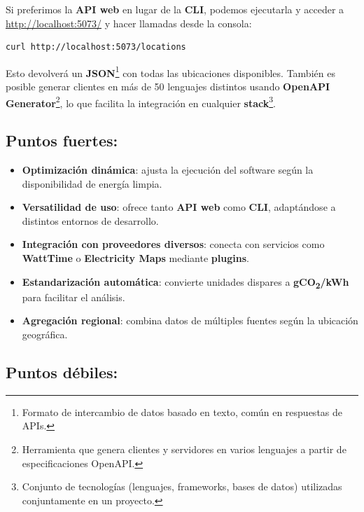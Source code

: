 \documentclass[12pt,a4paper]{report}
\begin{document}
Si preferimos la \textbf{API web} en
lugar de la \textbf{CLI}, podemos ejecutarla y
acceder a \href{http://localhost:5073}{http://localhost:5073/} y hacer llamadas
desde la consola:

\begin{tcolorbox}[colback=codebackground, colframe=codeborder, boxrule=0.8pt, arc=0mm, boxsep=5pt, left=5pt, right=5pt, top=5pt, bottom=5pt]
  \begin{lstlisting}[language=bash]
curl http://localhost:5073/locations
\end{lstlisting}
\end{tcolorbox}

Esto devolverá un \textbf{JSON}\footnote{Formato de intercambio de datos basado
  en texto, común en respuestas de APIs.} con todas las ubicaciones disponibles.
También es posible generar clientes en más de 50 lenguajes distintos usando
\textbf{OpenAPI Generator}\footnote{Herramienta que genera clientes y
  servidores en varios lenguajes a partir de especificaciones OpenAPI.}, lo que
facilita la integración en cualquier \textbf{stack}\footnote{Conjunto de
  tecnologías (lenguajes, frameworks, bases de datos) utilizadas conjuntamente en
  un proyecto.}.

\subsection*{Puntos fuertes:}

\begin{itemize}
  \item \textbf{Optimización dinámica}: ajusta la ejecución del software según la disponibilidad de energía limpia.
  \item \textbf{Versatilidad de uso}: ofrece tanto \textbf{API web} como \textbf{CLI}, adaptándose a distintos entornos de desarrollo.
  \item \textbf{Integración con proveedores diversos}: conecta con servicios como \textbf{WattTime} o \textbf{Electricity Maps} mediante \textbf{plugins}.
  \item \textbf{Estandarización automática}: convierte unidades dispares a \textbf{gCO\textsubscript{2}/kWh} para facilitar el análisis.
  \item \textbf{Agregación regional}: combina datos de múltiples fuentes según la ubicación geográfica.
\end{itemize}

\subsection*{Puntos débiles:}
\end{document}
